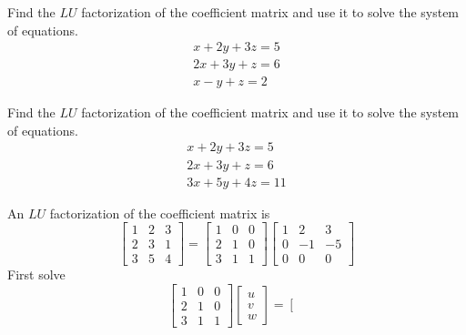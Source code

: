 \documentclass{ximera}
\begin{document}
\begin{problem}\label{prb:4.72} Find the $LU$ factorization of the coefficient matrix and use it to solve the system of equations.
\begin{equation*}
\begin{array}{c}
x+2y+3z=5 \\
2x+3y+z=6 \\
x-y+z=2
\end{array}
\end{equation*}
\end{problem}

\begin{problem}\label{prb:4.73} Find the $LU$ factorization of the coefficient matrix and use it to solve the system of equations.
\begin{equation*}
\begin{array}{c}
x+2y+3z=5 \\
2x+3y+z=6 \\
3x+5y+4z=11
\end{array}
\end{equation*}
\begin{hint}
An $LU$ factorization of the coefficient matrix is
\[
\left[
\begin{array}{rrr}
1 & 2 & 3 \\
2 & 3 & 1 \\
3 & 5 & 4
\end{array}
\right] = \left[
\begin{array}{rrr}
1 & 0 & 0 \\
2 & 1 & 0 \\
3 & 1 & 1
\end{array}
\right] \left[
\begin{array}{rrr}
1 & 2 & 3 \\
0 & -1 & -5 \\
0 & 0 & 0
\end{array}
\right]
\]
First solve
\[
 \left[
\begin{array}{rrr}
1 & 0 & 0 \\
2 & 1 & 0 \\
3 & 1 & 1
\end{array}
\right] \left[
\begin{array}{c}
u \\
v \\
w
\end{array}
\right] =\left[
\begin{array}{c}

\end{array}\]
\end{hint}
\end{problem}
\end{document}
